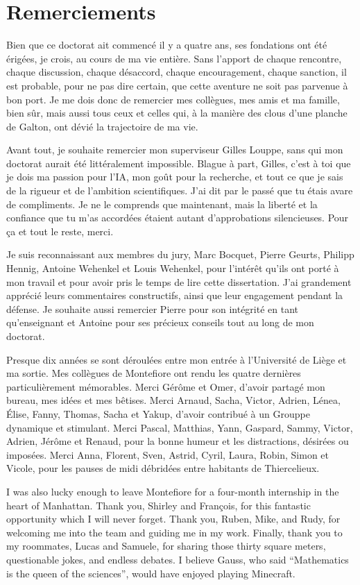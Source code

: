 \chapter*{Remerciements}

Bien que ce doctorat ait commencé il y a quatre ans, ses fondations ont été érigées, je crois, au cours de ma vie entière. Sans l'apport de chaque rencontre, chaque discussion, chaque désaccord, chaque encouragement, chaque sanction, il est probable, pour ne pas dire certain, que cette aventure ne soit pas parvenue à bon port. Je me dois donc de remercier mes collègues, mes amis et ma famille, bien sûr, mais aussi tous ceux et celles qui, à la manière des clous d'une planche de Galton, ont dévié la trajectoire de ma vie.

Avant tout, je souhaite remercier mon superviseur Gilles Louppe, sans qui mon doctorat aurait été littéralement impossible. Blague à part, Gilles, c'est à toi que je dois ma passion pour l'IA, mon goût pour la recherche, et tout ce que je sais de la rigueur et de l'ambition scientifiques. J'ai dit par le passé que tu étais avare de compliments. Je ne le comprends que maintenant, mais la liberté et la confiance que tu m'as accordées étaient autant d'approbations silencieuses. Pour ça et tout le reste, merci.

Je suis reconnaissant aux membres du jury, Marc Bocquet, Pierre Geurts, Philipp Hennig, Antoine Wehenkel et Louis Wehenkel, pour l'intérêt qu'ils ont porté à mon travail et pour avoir pris le temps de lire cette dissertation. J'ai grandement apprécié leurs commentaires constructifs, ainsi que leur engagement pendant la défense. Je souhaite aussi remercier Pierre pour son intégrité en tant qu'enseignant et Antoine pour ses précieux conseils tout au long de mon doctorat.

Presque dix années se sont déroulées entre mon entrée à l'Université de Liège et ma sortie. Mes collègues de Montefiore ont rendu les quatre dernières particulièrement mémorables. Merci Gérôme et Omer, d'avoir partagé mon bureau, mes idées et mes bêtises. Merci Arnaud, Sacha, Victor, Adrien, Lénea, Élise, Fanny, Thomas, Sacha et Yakup, d'avoir contribué à un Grouppe dynamique et stimulant. Merci Pascal, Matthias, Yann, Gaspard, Sammy, Victor, Adrien, Jérôme et Renaud, pour la bonne humeur et les distractions, désirées ou imposées. Merci Anna, Florent, Sven, Astrid, Cyril, Laura, Robin, Simon et Vicole, pour les pauses de midi débridées entre habitants de Thiercelieux.

I was also lucky enough to leave Montefiore for a four-month internship in the heart of Manhattan. Thank you, Shirley and François, for this fantastic opportunity which I will never forget. Thank you, Ruben, Mike, and Rudy, for welcoming me into the team and guiding me in my work. Finally, thank you to my roommates, Lucas and Samuele, for sharing those thirty square meters, questionable jokes, and endless debates. I believe Gauss, who said \enquote{Mathematics is the queen of the sciences}, would have enjoyed playing Minecraft.

